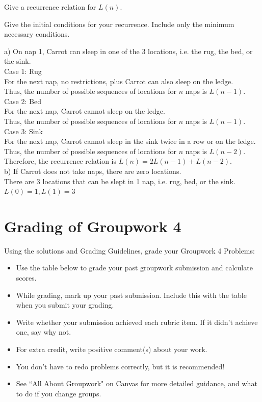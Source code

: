 \documentclass[12pt]{exam}
\newcommand{\prevhwnum}{4}
\begin{document}
\begin{qparts}
	\item Give a recurrence relation for $L(n).$
	\item Give the initial conditions for your recurrence. Include only the minimum necessary conditions.
\end{qparts}

\begin{solution}
	a) On nap 1, Carrot can sleep in one of the 3 locations, i.e. the rug, the bed, or the sink.\\
	Case 1: Rug\\
	For the next nap, no restrictions, plus Carrot can also sleep on the ledge.\\
	Thus, the number of possible sequences of locations for $n$ naps is $L(n-1)$.\\
	Case 2: Bed\\
	For the next nap, Carrot cannot sleep on the ledge.\\
	Thus, the number of possible sequences of locations for $n$ naps is $L(n-1)$.\\
	Case 3: Sink\\
	For the next nap, Carrot cannot sleep in the sink twice in a row or on the ledge.\\
	Thus, the number of possible sequences of locations for $n$ naps is $L(n-2)$.\\
	Therefore, the recurrence relation is $L(n)=2L(n-1)+L(n-2)$.\\
	b) If Carrot does not take naps, there are zero locations.\\
	There are 3 locations that can be slept in 1 nap, i.e. rug, bed, or the sink.\\
	$L(0)=1, L(1)=3$

\end{solution}


\pagebreak
\section*{Grading of Groupwork \prevhwnum{}}
Using the solutions and Grading Guidelines, grade your Groupwork \prevhwnum{} Problems:
\begin{itemize}
	\item Use the table below to grade your past groupwork submission and calculate scores.
	\item While grading, mark up your past submission. Include this with the table when you submit your grading.
	\item Write whether your submission achieved each rubric item. If it didn't achieve one, say why not.
	\item For extra credit, write positive comment(s) about your work.
	\item You don't have to redo problems correctly, but it is recommended!
	\item See ``All About Groupwork" on Canvas for more detailed guidance, and what to do if you change groups.
\end{itemize}
\end{document}
